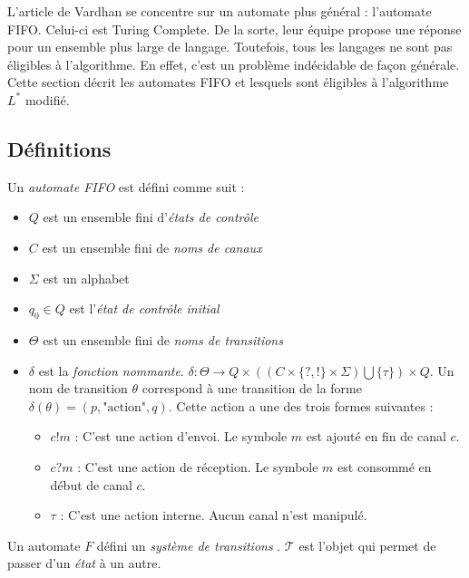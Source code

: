 L'article de Vardhan \cite{Vardhan04} se concentre sur un automate plus général : l'automate FIFO. Celui-ci est Turing Complete. De la sorte, leur équipe propose une réponse pour un ensemble plus large de langage. Toutefois, tous les langages ne sont pas éligibles à l'algorithme. En effet, c'est un problème indécidable de façon générale. Cette section décrit les automates FIFO et lesquels sont éligibles à l'algorithme $L^*$ modifié.




\subsection{Définitions}\label{ss:fifodef}

\begin{definition}
  Un \emph{automate FIFO} \fifo est défini comme suit :
  \begin{itemize}
    \item $Q$ est un ensemble fini d'\emph{états de contrôle}
    \item $C$ est un ensemble fini de \emph{noms de canaux}
    \item $\Sigma$ est un alphabet
    \item $q_0 \in Q$ est l'\emph{état de contrôle initial}
    \item $\Theta$ est un ensemble fini de \emph{noms de transitions}
    \item $\delta$ est la \emph{fonction nommante}. $\delta : \Theta \rightarrow Q \times ((C \times \{?,!\} \times \Sigma) \bigcup \{\tau\}) \times Q$. Un nom de transition $\theta$ correspond à une transition de la forme $\delta(\theta)=(p,\text{"action"},q)$. Cette action a une des trois formes suivantes :
    \begin{itemize}
      \item $c!m$ : C'est une action d'envoi. Le symbole $m$ est ajouté en fin de canal $c$.
      \item $c?m$ : C'est une action de réception. Le symbole $m$ est consommé en début de canal $c$.
      \item $\tau$ : C'est une action interne. Aucun canal n'est manipulé.
    \end{itemize}
  \end{itemize}
\end{definition}

Un automate $F$ défini un \emph{système de transitions} \tsys. $\mathcal{T}$ est l'objet qui permet de passer d'un \emph{état} à un autre.

